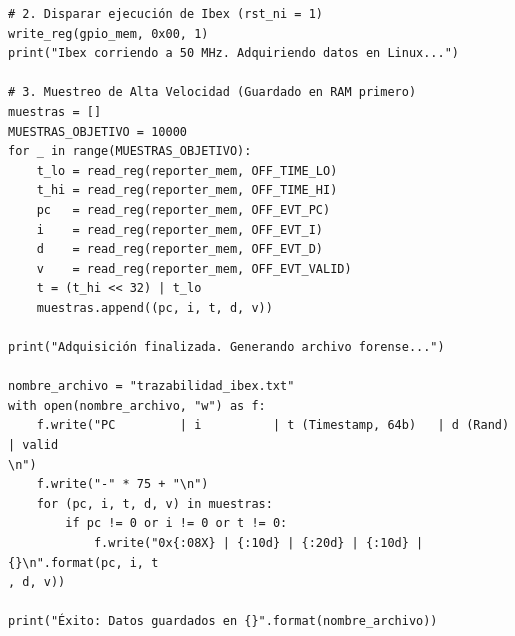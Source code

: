 \begin{lstlisting}[style=pythonstyle, basicstyle=\ttfamily\footnotesize, caption={Código recolector.py}, label={code:recolector.py}]
# 2. Disparar ejecución de Ibex (rst_ni = 1)
write_reg(gpio_mem, 0x00, 1)
print("Ibex corriendo a 50 MHz. Adquiriendo datos en Linux...")

# 3. Muestreo de Alta Velocidad (Guardado en RAM primero)
muestras = []
MUESTRAS_OBJETIVO = 10000
for _ in range(MUESTRAS_OBJETIVO):
    t_lo = read_reg(reporter_mem, OFF_TIME_LO)
    t_hi = read_reg(reporter_mem, OFF_TIME_HI)
    pc   = read_reg(reporter_mem, OFF_EVT_PC)
    i    = read_reg(reporter_mem, OFF_EVT_I)
    d    = read_reg(reporter_mem, OFF_EVT_D)
    v    = read_reg(reporter_mem, OFF_EVT_VALID)
    t = (t_hi << 32) | t_lo
    muestras.append((pc, i, t, d, v))

print("Adquisición finalizada. Generando archivo forense...")

nombre_archivo = "trazabilidad_ibex.txt"
with open(nombre_archivo, "w") as f:
    f.write("PC         | i          | t (Timestamp, 64b)   | d (Rand)   | valid                                                                                        \n")
    f.write("-" * 75 + "\n")
    for (pc, i, t, d, v) in muestras:
        if pc != 0 or i != 0 or t != 0:
            f.write("0x{:08X} | {:10d} | {:20d} | {:10d} | {}\n".format(pc, i, t                                                                                        , d, v))

print("Éxito: Datos guardados en {}".format(nombre_archivo))

\end{lstlisting}